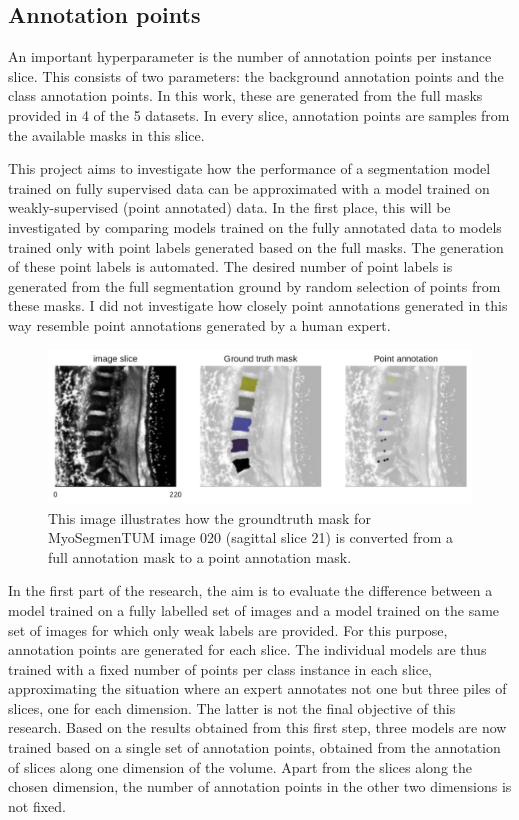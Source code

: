 \subsection{Annotation points\label{sec:annotationPoints}}
\par{
    An important hyperparameter is the number of annotation points per instance slice.
    This consists of two parameters: the background annotation points and the class annotation points.
    In this work, these are generated from the full masks provided in 4 of the 5 datasets.
    In every slice, annotation points are samples from the available masks in this slice.
}
\par{
    This project aims to investigate how the performance of a segmentation model trained on fully supervised data can be approximated with a model trained on weakly-supervised (point annotated) data.
    In the first place, this will be investigated by comparing models trained on the fully annotated data to models trained only with point labels generated based on the full masks.
    The generation of these point labels is automated. 
    The desired number of point labels is generated from the full segmentation ground by random selection of points from these masks.
    I did not investigate how closely point annotations generated in this way resemble point annotations generated by a human expert.
}
\begin{figure}
    \includegraphics[width=.99\textwidth]{images/MyoSegmenTUM020_s21_points.pdf}
    \caption{This image illustrates how the \Gls{groundtruth} mask for MyoSegmenTUM image 020 (sagittal slice 21) is converted from a full annotation mask to a point annotation mask.
    \protect
    }
\end{figure}
\par{
    In the first part of the research, the aim is to evaluate the difference between a model trained on a fully labelled set of images and a model trained on the same set of images for which only weak labels are provided.
    For this purpose, annotation points are generated for each slice.
    The individual models are thus trained with a fixed number of points per class instance in each slice,  approximating the situation where an expert annotates not one but three piles of slices, one for each dimension. The latter is not the final objective of this research.
    Based on the results obtained from this first step, three models are now trained based on a single set of annotation points, obtained from the annotation of slices along one dimension of the volume.
    Apart from the slices along the chosen dimension, the number of annotation points in the other two dimensions is not fixed.
}

